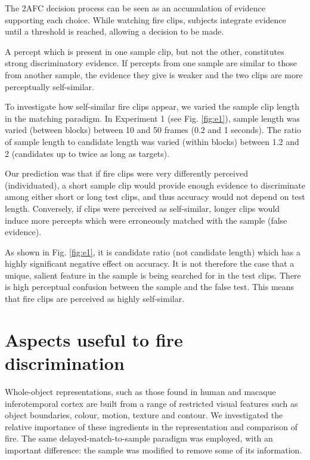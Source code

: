 \documentclass[a4paper]{article}
\begin{document}
The 2AFC decision process can be seen as an accumulation of evidence supporting each choice\cite{bogacz2006physics}. While watching fire clips, subjects integrate evidence until a threshold is reached, allowing a decision to be made.

A percept which is present in one sample clip, but not the other, constitutes strong discriminatory evidence. If percepts from one sample are similar to those from another sample, the evidence they give is weaker and the two clips are more perceptually self-similar.


To investigate how self-similar fire clips appear, we varied the sample clip length in the matching paradigm. In Experiment 1 (see Fig. \ref{fig:e1}), sample length was varied (between blocks) between 10 and 50 frames (0.2 and 1 seconds). The ratio of sample length to candidate length was varied (within blocks) between 1.2 and 2 (candidates up to twice as long as targets).

Our prediction was that if fire clips were very differently perceived (individuated), a short sample clip would provide enough evidence to discriminate among either short or long test clips, and thus accuracy would not depend on test length. Conversely, if clips were perceived as self-similar, longer clips would induce more percepts which were erroneously matched with the sample (false evidence).

As shown in Fig. \ref{fig:e1}, it is candidate ratio (not candidate length) which has a highly significant negative effect on accuracy. It is not therefore the case that a unique, salient feature in the sample is being searched for in the test clips. There is high perceptual confusion between the sample and the false test. This means that fire clips are perceived as highly self-similar.

\section{Aspects useful to fire discrimination}

Whole-object representations, such as those found in human and macaque inferotemporal cortex\cite{kriegeskorte2008matching,baker2002impact,freedman2003comparison} are built from a range of restricted visual features such as object boundaries, colour, motion, texture and contour\cite{tsunoda2001complex,pasupathy1999responses}. We investigated the relative importance of these ingredients in the representation and comparison of fire. The same delayed-match-to-sample paradigm was employed, with an important difference: the sample was modified to remove some of its information. 
\end{document}

